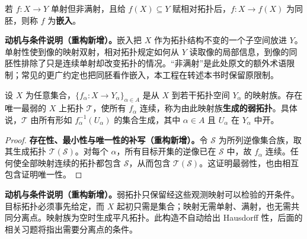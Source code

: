 \documentclass[../../main.tex]{subfiles}%
\begin{document}
\begin{definition}[嵌入]\label{definition:ch04-embedding}
若 $f:X\to Y$ 单射但非满射，且给 $f(X)\subseteq Y$ 赋相对拓扑后，$f:X\to f(X)$ 为同胚，则称 $f$ 为\textbf{嵌入}。
\end{definition}
\begin{remark}
\textbf{动机与条件说明（重构新增）。}嵌入把 $X$ 作为拓扑结构不变的一个子空间放进 $Y$。单射性使到像的映射双射，相对拓扑规定如何从 $Y$ 读取像的局部信息，到像的同胚性排除了只是连续单射却改变拓扑的情况。“非满射”是此处原文的额外术语限制；常见的更广约定也把同胚看作嵌入，本工程在转述本书时保留原限制。
\end{remark}
\begin{definition}[映射族生成的弱拓扑]\label{definition:ch04-generated-weak-topology}
设 $X$ 为任意集合，$\{f_\alpha:X\to Y_\alpha\}_{\alpha\in A}$ 是从 $X$ 到若干拓扑空间 $Y_\alpha$ 的映射族。存在唯一最弱的 $X$ 上拓扑 $\mathcal T$，使所有 $f_\alpha$ 连续，称为由此映射族\textbf{生成的弱拓扑}。具体说，$\mathcal T$ 由所有形如 $f_\alpha^{-1}(U_\alpha)$ 的集合生成，其中 $\alpha\in A$ 且 $U_\alpha$ 在 $Y_\alpha$ 中开。
\end{definition}
\begin{proof}
\textbf{存在性、最小性与唯一性的补写（重构新增）。}令 $\mathcal S$ 为所列逆像集合族，取其生成拓扑 $\mathcal T(\mathcal S)$。对每个 $\alpha$，所有目标开集的逆像已在 $\mathcal S$ 中，故 $f_\alpha$ 连续。任何使全部映射连续的拓扑都包含 $\mathcal S$，从而包含 $\mathcal T(\mathcal S)$。这证明最弱性，也由相互包含证明唯一性。
\end{proof}
\begin{remark}
\textbf{动机与条件说明（重构新增）。}弱拓扑只保留经这些观测映射可以检验的开条件。目标拓扑必须事先给定，而 $X$ 起初只需是集合；映射无需单射、满射，也无需共同分离点。映射族为空时生成平凡拓扑。此构造不自动给出 Hausdorff 性，后面的相关习题将指出需要分离点的条件。
\end{remark}
\end{document}
